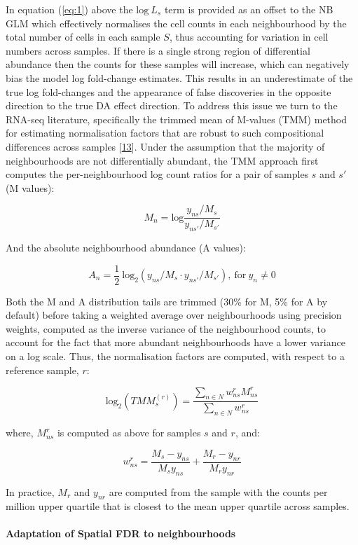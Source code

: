 \documentclass[
]{article}
\begin{document}
In equation (\ref{eq:1}) above the \(\mbox{log}\ L_s\) term is provided as an offset to the NB GLM which effectively normalises the cell counts in
each neighbourhood by the total number of cells in each sample \(S\), thus accounting for variation in cell numbers across samples. If there is a
single strong region of differential abundance then the counts for these samples will increase, which can negatively bias the model log fold-change
estimates. This results in an underestimate of the true log fold-changes and the appearance of false discoveries in the opposite direction to the
true DA effect direction. To address this issue we
turn to the RNA-seq literature, specifically the trimmed mean of M-values (TMM) method for estimating normalisation factors that
are robust to such compositional differences across samples {[}\protect\hyperlink{ref-robinsonTMM2010}{13}{]}. Under the assumption that the majority of neighbourhoods are
not differentially abundant, the TMM approach first computes the per-neighbourhood log count ratios for a pair of samples \(s\) and \(s'\)
(M values):

\[ 
M_{n} = \mbox{log} \frac{y_{ns}/M_s}{y_{ns'}/M_{s'}}
\]

And the absolute neighbourhood abundance (A values):

\[
A_{n} = \frac{1}{2}\ \mbox{log}_{2} (y_{ns}/M_{s} \cdot y_{ns'}/M_{s'}),\ \mbox{for}\ y_{n} \neq 0
\]

Both the M and A distribution tails are trimmed (30\% for M, 5\% for A by default) before taking a weighted average over neighbourhoods using precision weights,
computed as the inverse variance of the neighbourhood counts, to account for the fact that more abundant neighbourhoods have a lower variance on a
log scale. Thus, the normalisation factors are computed, with respect to a reference sample, \(r\):

\[
\mbox{log}_2(TMM_{s}^{(r)})= \frac{\sum_{n \in N} w^r_{ns}M^r_{ns}}{\sum_{n \in N} w^r_{ns}}
\]

where, \(M^r_{ns}\) is computed as above for samples \(s\) and \(r\), and:

\[
w^r_{ns} = \frac{M_s-y_{ns}}{M_sy_{ns}} + \frac{M_r-y_{nr}}{M_ry_{nr}}
\]

In practice, \(M_r\) and \(y_{nr}\) are computed from the sample with the counts per million upper quartile that is closest to the mean upper quartile across samples.

\hypertarget{adaptation-of-spatial-fdr-to-neighbourhoods}{%
\paragraph*{Adaptation of Spatial FDR to neighbourhoods}\label{adaptation-of-spatial-fdr-to-neighbourhoods}}
\end{document}
